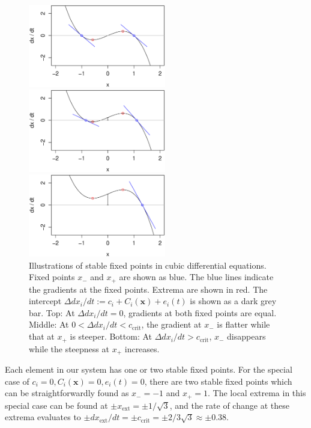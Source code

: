 \documentclass[conference]{IEEEtran}
\newcommand{\vectorsym}[1]{\ensuremath{\mathbf{#1}}}
\newcommand{\xextremum}{\ensuremath{x_{\mathrm{ext}}}}
\newcommand{\ccrit}{\ensuremath{c_{\mathrm{crit}}}}
\newcommand{\agentimpact}{\ensuremath{e}}
\newcommand{\couplingfunction}{\ensuremath{C}}
\begin{document}
\begin{figure}

  \centerline{\includegraphics[width=6cm]{cubicdemo_intercept000.eps}}

  \centerline{\includegraphics[width=6cm]{cubicdemo_intercept025.eps}}

  \centerline{\includegraphics[width=6cm]{cubicdemo_intercept100.eps}}

  \caption{Illustrations of stable fixed points in cubic differential
    equations. Fixed points $x_{-}$ and $x_{+}$ are shown as blue. The
    blue lines indicate the gradients at the fixed points. Extrema are
    shown in red. The intercept
    $\Delta dx_i / dt := c_i + \couplingfunction_i(\vectorsym{x}) + \agentimpact_i(t)$ is
    shown as a dark grey bar. Top: At $\Delta dx_i / dt = 0$,
    gradients at both fixed points are equal. Middle: At
    $0 < \Delta dx_i / dt < \ccrit$, the gradient at $x_{-}$ is flatter
    while that at $x_{+}$ is steeper. Bottom: At
    $\Delta dx_i / dt > \ccrit$, $x_{-}$ disappears while the steepness
    at $x_{+}$ increases.}
  \label{fig_cubicdemo}

\end{figure}

Each element in our system has one or two stable fixed points. For the
special case of
$c_i = 0, \couplingfunction_i(\vectorsym{x}) = 0, \agentimpact_i(t) = 0$, there are two
stable fixed points which can be straightforwardly found as
$x_{-} = -1$ and $x_{+} = 1$. The local extrema in this special case
can be found at $\pm \xextremum = \pm 1 / \sqrt{3}$, and the rate of
change at these extrema evaluates to
$\pm d\xextremum / dt = \pm \ccrit = \pm 2 / 3\sqrt{3} \approx \pm
0.38$.
\end{document}
